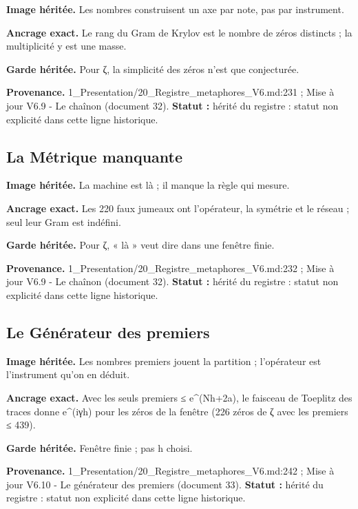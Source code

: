 \documentclass[
  9pt,
  a4paper,
]{article}
\begin{document}
\textbf{Image héritée.} Les nombres construisent un axe par note, pas
par instrument.

\textbf{Ancrage exact.} Le rang du Gram de Krylov est le nombre de zéros
distincts ; la multiplicité y est une masse.

\textbf{Garde héritée.} Pour ζ, la simplicité des zéros n'est que
conjecturée.

\textbf{Provenance.} 1\_Presentation/20\_Registre\_metaphores\_V6.md:231
; Mise à jour V6.9 - Le chaînon (document 32). \textbf{Statut :} hérité
du registre : statut non explicité dans cette ligne historique.

\hypertarget{la-muxe9trique-manquante}{%
\subsection{La Métrique manquante}\label{la-muxe9trique-manquante}}

\textbf{Image héritée.} La machine est là ; il manque la règle qui
mesure.

\textbf{Ancrage exact.} Les 220 faux jumeaux ont l'opérateur, la
symétrie et le réseau ; seul leur Gram est indéfini.

\textbf{Garde héritée.} Pour ζ, « là » veut dire dans une fenêtre finie.

\textbf{Provenance.} 1\_Presentation/20\_Registre\_metaphores\_V6.md:232
; Mise à jour V6.9 - Le chaînon (document 32). \textbf{Statut :} hérité
du registre : statut non explicité dans cette ligne historique.

\hypertarget{le-guxe9nuxe9rateur-des-premiers}{%
\subsection{Le Générateur des
premiers}\label{le-guxe9nuxe9rateur-des-premiers}}

\textbf{Image héritée.} Les nombres premiers jouent la partition ;
l'opérateur est l'instrument qu'on en déduit.

\textbf{Ancrage exact.} Avec les seuls premiers ≤ e\^{}(Nh+2a), le
faisceau de Toeplitz des traces donne e\^{}(iγh) pour les zéros de la
fenêtre (226 zéros de ζ avec les premiers ≤ 439).

\textbf{Garde héritée.} Fenêtre finie ; pas h choisi.

\textbf{Provenance.} 1\_Presentation/20\_Registre\_metaphores\_V6.md:242
; Mise à jour V6.10 - Le générateur des premiers (document 33).
\textbf{Statut :} hérité du registre : statut non explicité dans cette
ligne historique.
\end{document}
